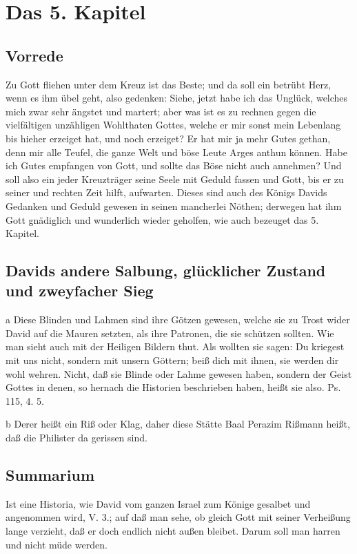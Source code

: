 \chapter{Das 5. Kapitel}

\section{Vorrede}

Zu Gott fliehen unter dem Kreuz ist das Beste; und da soll ein betrübt Herz, wenn es ihm übel geht, also gedenken: Siehe, jetzt habe ich das Unglück, welches mich zwar sehr ängstet und martert; aber was ist es zu rechnen gegen die vielfältigen unzähligen Wohlthaten Gottes, welche er mir sonst mein Lebenlang bis hieher erzeiget hat, und noch erzeiget? Er hat mir ja mehr Gutes gethan, denn mir alle Teufel, die ganze Welt und böse Leute Arges anthun können. Habe ich Gutes empfangen von Gott, und sollte das Böse nicht auch annehmen? Und soll also ein jeder Kreuzträger seine Seele mit Geduld fassen und Gott, bis er zu seiner und rechten Zeit hilft, aufwarten. Dieses sind auch des Königs Davids Gedanken und Geduld gewesen in seinen mancherlei Nöthen; derwegen hat ihm Gott gnädiglich und wunderlich wieder geholfen, wie auch bezeuget das 5. Kapitel.

\section{Davids andere Salbung, glücklicher Zustand und zweyfacher Sieg}

a Diese Blinden und Lahmen sind ihre Götzen gewesen, welche sie zu Trost wider David auf die Mauren setzten, als ihre Patronen, die sie schützen sollten. Wie man sieht auch mit der Heiligen Bildern thut. Als wollten sie sagen: Du kriegest mit uns nicht, sondern mit unsern Göttern; beiß dich mit ihnen, sie werden dir wohl wehren. Nicht, daß sie Blinde oder Lahme gewesen haben, sondern der Geist Gottes in denen, so hernach die Historien beschrieben haben, heißt sie also. Ps. 115, 4. 5.

b Derer heißt ein Riß oder Klag, daher diese Stätte Baal Perazim Rißmann heißt, daß die Philister da gerissen sind.

\section{Summarium}

Ist eine Historia, wie David vom ganzen Israel zum Könige gesalbet und angenommen wird, V. 3.; auf daß man sehe, ob gleich Gott mit seiner Verheißung lange verzieht, daß er doch endlich nicht außen bleibet. Darum soll man harren und nicht müde werden.

